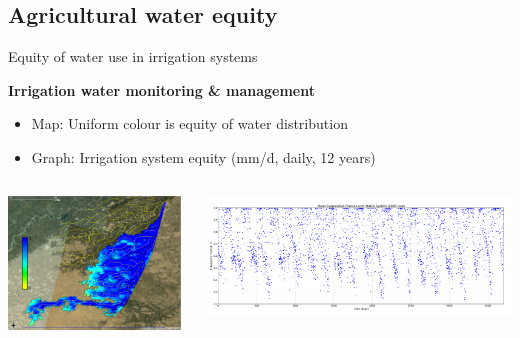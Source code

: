 \documentclass[aspectratio=169,unknownkeysallowed,xcolor=dvipsnames,beamer]{beamer} %
\begin{document}
\subsection{Agricultural water equity}
\begin{frame}[fragile]{Equity of water use in irrigation systems}

\textbf{Irrigation water monitoring \& management}
\begin{itemize}
 \item Map: Uniform colour is equity of water distribution
 \item Graph: Irrigation system equity (mm/d, daily, 12 years)
\end{itemize}

\begin{columns}
\begin{center}
\includegraphics[width=5cm]{fess2012ef}
\end{center}

\begin{flushleft}
  \includegraphics[width=9cm]{fess2012meaneftemporal}
\end{flushleft}
\end{columns}
\end{frame}
\end{document}
